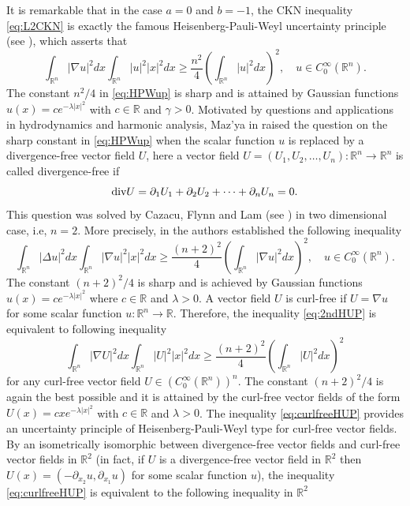 \documentclass[a4paper,12pt]{article}
\theoremstyle{plain}
\theoremstyle{definition}
\theoremstyle{remark}
\def\R{\mathbb R}%
\def\lt{\left}%
\def\rt{\right}%
\numberwithin{equation}{section}
\begin{document}
It is remarkable that in the case $a =0$ and $b =-1$, the CKN inequality \eqref{eq:L2CKN} is exactly the famous Heisenberg-Pauli-Weyl uncertainty principle (see \cite{Heisenberg,Weyl}), which asserts that 
\begin{equation}\label{eq:HPWup}
\int_{\R^n} |\nabla u|^2 dx \int_{\R^n} |u|^2 |x|^2 dx \geq \frac{n^2}4 \lt(\int_{\R^n} |u|^2 dx\rt)^2,\quad u \in C_0^\infty(\R^n).
\end{equation}
The constant $n^2/4$ in \eqref{eq:HPWup} is sharp and is attained by Gaussian functions $u(x) = c e^{-\lambda |x|^2}$ with $c \in \R$ and $\gamma > 0$. Motivated by questions and applications in hydrodynamics and harmonic analysis, Maz'ya in \cite[Section $3.9$]{Mazya} raised the question on the sharp constant in \eqref{eq:HPWup} when the scalar function $u$ is replaced by a divergence-free vector field $U$, here a vector field $U = (U_1,U_2,\ldots,U_n) : \R^n \to \R^n$ is called divergence-free if 
\[
\text{\rm div} U = \partial_1 U_1 + \partial_2 U_2 + \cdots+ \partial_n U_n = 0.
\]
This question was solved by Cazacu, Flynn and Lam (see \cite{CFL22}) in two dimensional case, i.e, $n =2$. More precisely, in \cite{CFL22} the authors established the following inequality
\begin{equation}\label{eq:2ndHUP}
\int_{\R^n} |\Delta u|^2 dx \int_{\R^n} |\nabla u|^2 |x|^2 dx \geq \frac{(n+2)^2}4 \lt(\int_{\R^n} |\nabla u|^2 dx\rt)^2,\quad u\in C_0^\infty(\R^n).
\end{equation}
The constant $(n+2)^2/4$ is sharp and is achieved by Gaussian functions $u(x) = c e^{-\lambda |x|^2}$ where $c \in \R$ and $\lambda >0$. A vector field $U$ is curl-free if $U =\nabla u$ for some scalar function $u: \R^n \to \R$. Therefore, the inequality \eqref{eq:2ndHUP} is equivalent to following inequality
\begin{equation}\label{eq:curlfreeHUP}
\int_{\R^n} |\nabla U|^2 dx \int_{\R^n} |U|^2 |x|^2 dx \geq \frac{(n+2)^2}4 \lt(\int_{\R^n} |U|^2 dx\rt)^2
\end{equation}
for any curl-free vector field $U\in (C_0^\infty(\R^n))^n$. The constant $(n+2)^2/4$  is again the best possible and it is attained by the curl-free vector fields of the form $U(x) = c x e^{-\lambda |x|^2}$ with $c\in \R$ and $\lambda >0$. The inequality \eqref{eq:curlfreeHUP} provides an uncertainty principle of Heisenberg-Pauli-Weyl type for curl-free vector fields. By an isometrically isomorphic between divergence-free vector fields and curl-free vector fields in $\R^2$ (in fact, if $U$ is a divergence-free vector field in $\R^2$ then $U(x) = (-\partial_{x_2} u, \partial_{x_1} u)$ for some scalar function $u$), the inequality \eqref{eq:curlfreeHUP} is equivalent to the following inequality in $\R^2$
\end{document}
